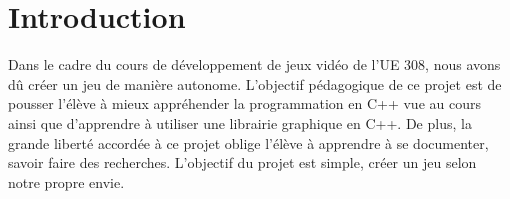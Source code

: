 \section{Introduction}
Dans le cadre du cours de développement de jeux vidéo de l'UE 308, nous avons dû créer un jeu de manière autonome.
L'objectif pédagogique de ce projet est de pousser l'élève à mieux appréhender la programmation en C++ vue au cours ainsi que d'apprendre à utiliser une librairie graphique en C++.
De plus, la grande liberté accordée à ce projet oblige l'élève à apprendre à se documenter, savoir faire des recherches.
L'objectif du projet est simple, créer un jeu selon notre propre envie.
